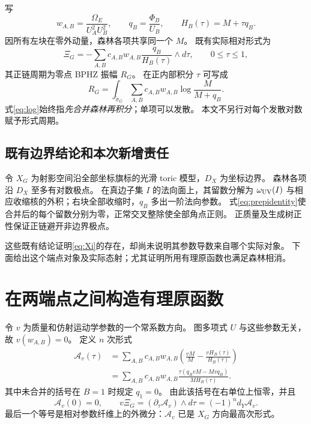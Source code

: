 \documentclass[11pt,a4paper]{ctexart}
\theoremstyle{cnplain}
\theoremstyle{remark}\newtheorem{remark}[theorem]{注}
\begin{document}
写
\begin{equation}\label{eq:wq}
 w_{A,B}=\frac{\Omega_E}{U_A^2U_B^2},\qquad
 q_B=\frac{\Phi_B}{U_B},\qquad H_B(\tau)=M+\tau q_B.
\end{equation}
因所有左块在零外动量，森林各项共享同一个 $M$。
既有实际相对形式为
\begin{equation}\label{eq:Xi}
 \Xi_G=-\sum_{A,B}c_{A,B}w_{A,B}
                     \frac{q_B}{H_B(\tau)}\wedge d\tau,
 \qquad 0\leq\tau\leq1,
\end{equation}
其正链周期为零点 BPHZ 振幅 $R_G$。
在正内部积分 $\tau$ 可写成
\begin{equation}\label{eq:log}
 R_G=\int_{\widetilde\sigma_G}
       \sum_{A,B}c_{A,B}w_{A,B}\log\frac{M}{M+q_B}.
\end{equation}
式\eqref{eq:log}始终指\emph{先合并森林再积分}；单项可以发散。
本文不另行对每个发散对数赋予形式周期。

\subsection{既有边界结论和本次新增责任}
令 $X_G$ 为射影空间沿全部坐标旗标的光滑 toric 模型，$D_X$ 为坐标边界。
森林各项沿 $D_X$ 至多有对数极点。
在真边子集 $I$ 的法向面上，其留数分解为 $\omega_{\rm UV}(I)$ 与相应收缩核的外积；右块全部收缩时，$q_B$ 多出一阶法向参数。
式\eqref{eq:prepidentity}使合并后的每个留数分别为零，正常交叉整除使全部角点正则。
正质量及生成树正性保证正链避开非边界极点。

这些既有结论证明\eqref{eq:Xi}的存在，却尚未说明其参数导数来自哪个实际对象。
下面给出这个端点对象及实际态射；尤其证明所用有理原函数也满足森林相消。

\section{在两端点之间构造有理原函数}
令 $v$ 为质量和仿射运动学参数的一个常系数方向。
图多项式 $U$ 与这些参数无关，故 $v(w_{A,B})=0$。
定义 $n$ 次形式
\begin{align}\label{eq:Hprimitive}
 \mathcal A_v(\tau)
 &=\sum_{A,B}c_{A,B}w_{A,B}
       \left(\frac{vM}{M}-\frac{vH_B(\tau)}{H_B(\tau)}\right)\nonumber\\
 &=\sum_{A,B}c_{A,B}w_{A,B}
       \frac{\tau(q_BvM-Mvq_B)}{M H_B(\tau)}.
\end{align}
其中未合并的括号在 $B=1$ 时规定 $q_1=0$。
由此该括号在右单位上恒零，并且
\begin{equation}\label{eq:endpointzero}
 \mathcal A_v(0)=0,\qquad
 v\Xi_G=(\partial_\tau\mathcal A_v)\wedge d\tau
             =(-1)^n d_Y\mathcal A_v.
\end{equation}
最后一个等号是相对参数纤维上的外微分：$\mathcal A_v$ 已是 $X_G$ 方向最高次形式。
\end{document}

